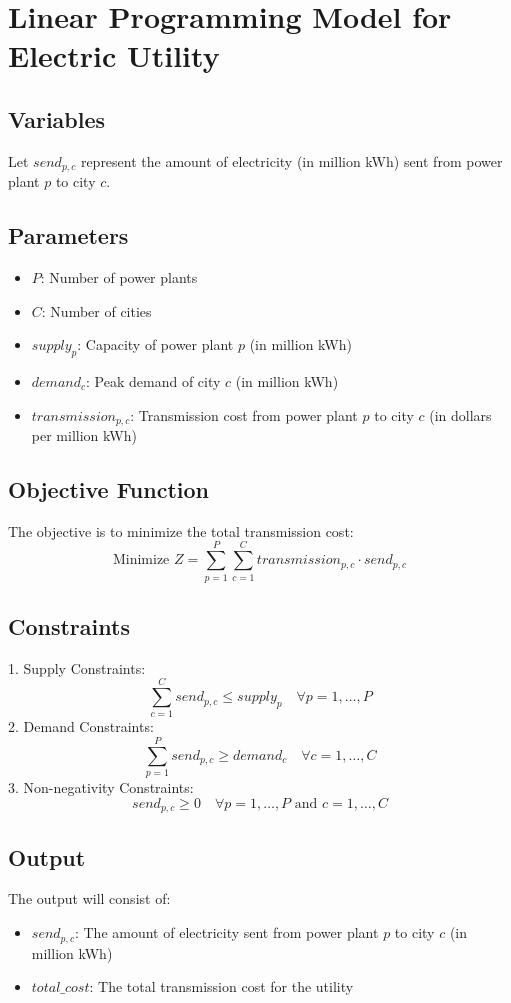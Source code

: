 \documentclass{article}
\begin{document}
\section*{Linear Programming Model for Electric Utility}

\subsection*{Variables}
Let \( send_{p,c} \) represent the amount of electricity (in million kWh) sent from power plant \( p \) to city \( c \).

\subsection*{Parameters}
\begin{itemize}
    \item \( P \): Number of power plants
    \item \( C \): Number of cities
    \item \( supply_p \): Capacity of power plant \( p \) (in million kWh)
    \item \( demand_c \): Peak demand of city \( c \) (in million kWh)
    \item \( transmission_{p,c} \): Transmission cost from power plant \( p \) to city \( c \) (in dollars per million kWh)
\end{itemize}

\subsection*{Objective Function}
The objective is to minimize the total transmission cost:
\[
\text{Minimize } Z = \sum_{p=1}^{P} \sum_{c=1}^{C} transmission_{p,c} \cdot send_{p,c}
\]

\subsection*{Constraints}
1. Supply Constraints:
\[
\sum_{c=1}^{C} send_{p,c} \leq supply_p \quad \forall p = 1, \ldots, P
\]
2. Demand Constraints:
\[
\sum_{p=1}^{P} send_{p,c} \geq demand_c \quad \forall c = 1, \ldots, C
\]
3. Non-negativity Constraints:
\[
send_{p,c} \geq 0 \quad \forall p = 1, \ldots, P \text{ and } c = 1, \ldots, C
\]

\subsection*{Output}
The output will consist of:
\begin{itemize}
    \item \( send_{p,c} \): The amount of electricity sent from power plant \( p \) to city \( c \) (in million kWh)
    \item \( total\_cost \): The total transmission cost for the utility
\end{itemize}
\end{document}
